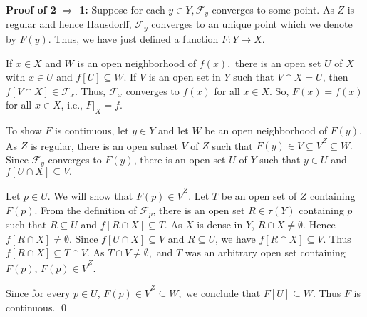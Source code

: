 \documentclass{article}
\begin{document}
\vskip 20pt


\textbf{Proof of 2 $\Rightarrow$ 1: } Suppose for each $y\in Y, \mathcal{F}_y$ converges to some point. As $Z$ is regular and hence Hausdorff, $\mathcal{F}_y$ converges to an unique point which we denote by $F(y)$. Thus, we have just defined a function $F:Y\rightarrow X$.

\vskip 10pt

If $x\in X$ and $W$ is an open neighborhood of $f(x),$ there is an open set $U$ of $X$ with $x\in U$ and $f[U]\subseteq W.$ 
If $V$ is an open set in $Y$ such that $V\cap X =U$, then $f\left[V\cap X\right] \in \mathcal{F}_x$. Thus, $\mathcal{F}_x$ converges to $f(x)$ for all $x\in X$. So, $F(x)=f(x)$ for all $x\in X$, i.e., $F|_X=f$.

\vskip 15pt

To show $F$ is continuous, let $y\in Y$ and let $W$ be an open neighborhood of $F(y)$. As $Z$ is regular, there is an open subset $V$ of $Z$ such that $F(y)\in V\subseteq \overline{V}^Z \subseteq W.$ Since $\mathcal{F}_y$ converges to $F(y)$, there is an open set $U$ of $Y$ such that $y\in U$ and $f\left[ U\cap X\right]\subseteq V.$

\vskip 10pt

Let $p\in U.$ We will show that $F(p)\in \overline{V}^Z.$ Let $T$ be an open set of $Z$ containing $F(p)$. From the definition of $\mathcal{F}_p$, there is an open set $R\in \tau(Y)$ containing $p$ such that $R\subseteq U$ and $f\left[R\cap X\right]\subseteq T.$ As $X$ is dense in $Y$, $R\cap X\neq \emptyset$. Hence $f\left[R\cap X\right]\neq \emptyset.$ Since $f\left[U\cap X\right]\subseteq V$ and $R\subseteq U$, we have $f\left[R\cap X\right]\subseteq V$. Thus $f\left[R\cap X\right]\subseteq T\cap V.$ As $T\cap V\neq \emptyset,$ and $T$ was an arbitrary open set containing $F(p)$, $F(p)\in \overline{V}^Z$.

\vskip 10pt

Since for every $p\in U$, $F(p)\in \overline{V}^Z\subseteq W,$ we conclude that $F[U]\subseteq W.$ Thus $F$ is continuous. \qed










\vskip 40pt
\end{document}
